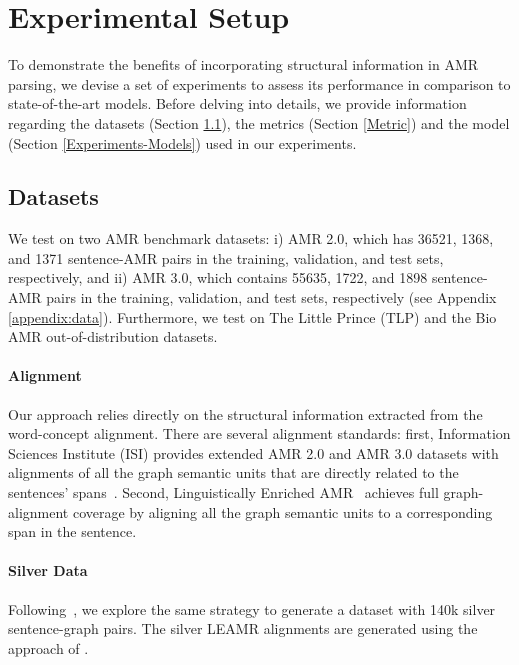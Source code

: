 \documentclass[11pt]{article}
\begin{document}
\section{Experimental Setup}

To demonstrate the benefits of incorporating structural information in AMR parsing, we devise a set of experiments to assess its performance in comparison to state-of-the-art models. Before delving into details, we provide information regarding the datasets (Section \ref{Datasets}), the metrics (Section \ref{Metric}) and the model (Section \ref{Experiments-Models}) used in our experiments.

\subsection{Datasets}\label{Datasets}

We test on two AMR benchmark datasets: i) AMR 2.0, which has 36521, 1368, and 1371 sentence-AMR pairs in the training, validation, and test sets, respectively, and ii) AMR 3.0, which contains 55635, 1722, and 1898 sentence-AMR pairs in the training, validation, and test sets, respectively (see Appendix \ref{appendix:data}). Furthermore, we test on The Little Prince (TLP) and the Bio AMR out-of-distribution datasets.

\paragraph{Alignment}

Our approach relies directly on the structural information extracted from the word-concept alignment. There are several alignment standards: first, Information Sciences Institute (ISI) provides extended AMR 2.0 and AMR 3.0 datasets with alignments of all the graph semantic units that are directly related to the sentences' spans~\cite{pourdamghani-etal-2014-aligning}. Second, Linguistically Enriched AMR~\citep[LEAMR]{blodgett-schneider-2021-probabilistic} achieves full graph-alignment coverage by aligning all the graph semantic units to a corresponding span in the sentence.

\paragraph{Silver Data} 
Following~\citet{bevilacqua-etal-2021-one}, we explore the same strategy to generate a dataset with 140k silver sentence-graph pairs. The silver LEAMR alignments are generated using the approach of \citet{amr-alignment-2022}.
\end{document}

